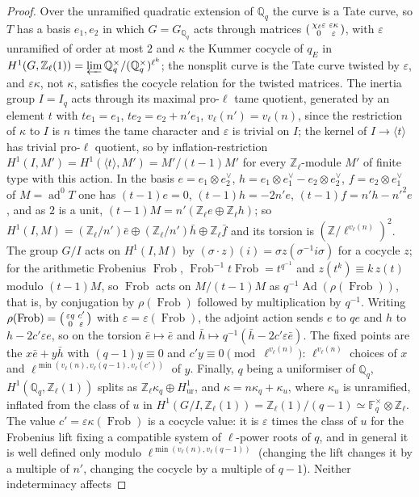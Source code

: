 \documentclass[11pt]{amsart}
\theoremstyle{definition}
\newcommand{\Q}{\mathbb{Q}}
\newcommand{\Z}{\mathbb{Z}}
\newcommand{\F}{\mathbb{F}}
\newcommand{\ad}{\operatorname{ad}^0}
\newcommand{\Frob}{\operatorname{Frob}}
\begin{document}
\begin{proof}
Over the unramified quadratic extension of $\Q_q$ the curve is a Tate curve, so $T$ has a basis $e_1,e_2$ in which $G=G_{\Q_q}$ acts through matrices $\begin{psmallmatrix}\chi_\ell\varepsilon&\varepsilon\kappa\\0&\varepsilon\end{psmallmatrix}$, with $\varepsilon$ unramified of order at most $2$ and $\kappa$ the Kummer cocycle of $q_E$ in $H^1(G,\Z_\ell(1))=\varprojlim\Q_q^\times/(\Q_q^\times)^{\ell^k}$; the nonsplit curve is the Tate curve twisted by $\varepsilon$, and $\varepsilon\kappa$, not $\kappa$, satisfies the cocycle relation for the twisted matrices. The inertia group $I=I_q$ acts through its maximal pro-$\ell$ tame quotient, generated by an element $t$ with $te_1=e_1$, $te_2=e_2+n'e_1$, $v_\ell(n')=v_\ell(n)$, since the restriction of $\kappa$ to $I$ is $n$ times the tame character and $\varepsilon$ is trivial on $I$; the kernel of $I\to\langle t\rangle$ has trivial pro-$\ell$ quotient, so by inflation-restriction $H^1(I,M')=H^1(\langle t\rangle,M')=M'/(t-1)M'$ for every $\Z_\ell$-module $M'$ of finite type with this action. In the basis $e=e_1\otimes e_2^\vee$, $h=e_1\otimes e_1^\vee-e_2\otimes e_2^\vee$, $f=e_2\otimes e_1^\vee$ of $M=\ad T$ one has $(t-1)e=0$, $(t-1)h=-2n'e$, $(t-1)f=n'h-n'^2e$, and as $2$ is a unit, $(t-1)M=n'(\Z_\ell e\oplus\Z_\ell h)$; so $H^1(I,M)=(\Z_\ell/n')\bar e\oplus(\Z_\ell/n')\bar h\oplus\Z_\ell\bar f$ and its torsion is $(\Z/\ell^{v_\ell(n)})^2$. The group $G/I$ acts on $H^1(I,M)$ by $(\sigma\cdot z)(i)=\sigma z(\sigma^{-1}i\sigma)$ for a cocycle $z$; for the arithmetic Frobenius $\Frob$, $\Frob^{-1}t\Frob=t^{q^{-1}}$ and $z(t^k)\equiv k\,z(t)$ modulo $(t-1)M$, so $\Frob$ acts on $M/(t-1)M$ as $q^{-1}\operatorname{Ad}(\rho(\Frob))$, that is, by conjugation by $\rho(\Frob)$ followed by multiplication by $q^{-1}$. Writing $\rho(\Frob)=\begin{psmallmatrix}\varepsilon q&c'\\0&\varepsilon\end{psmallmatrix}$ with $\varepsilon=\varepsilon(\Frob)$, the adjoint action sends $e$ to $qe$ and $h$ to $h-2c'\varepsilon e$, so on the torsion $\bar e\mapsto\bar e$ and $\bar h\mapsto q^{-1}(\bar h-2c'\varepsilon\bar e)$. The fixed points are the $x\bar e+y\bar h$ with $(q-1)y\equiv0$ and $c'y\equiv0\pmod{\ell^{v_\ell(n)}}$: $\ell^{v_\ell(n)}$ choices of $x$ and $\ell^{\min(v_\ell(n),v_\ell(q-1),v_\ell(c'))}$ of $y$. Finally, $q$ being a uniformiser of $\Q_q$, $H^1(\Q_q,\Z_\ell(1))$ splits as $\Z_\ell\kappa_q\oplus H^1_{\mathrm{ur}}$, and $\kappa=n\kappa_q+\kappa_u$, where $\kappa_u$ is unramified, inflated from the class of $u$ in $H^1(G/I,\Z_\ell(1))=\Z_\ell(1)/(q-1)\simeq\F_q^\times\otimes\Z_\ell$. The value $c'=\varepsilon\kappa(\Frob)$ is a cocycle value: it is $\varepsilon$ times the class of $u$ for the Frobenius lift fixing a compatible system of $\ell$-power roots of $q$, and in general it is well defined only modulo $\ell^{\min(v_\ell(n),v_\ell(q-1))}$ (changing the lift changes it by a multiple of $n'$, changing the cocycle by a multiple of $q-1$). Neither indeterminacy affects 
\end{proof}
\end{document}
